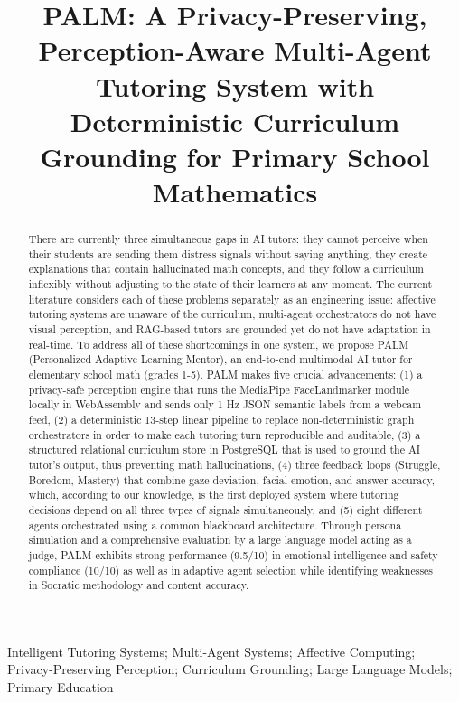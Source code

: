 \documentclass[conference, letterpaper]{IEEEtran}
\title{PALM: A Privacy-Preserving, Perception-Aware Multi-Agent Tutoring System with Deterministic Curriculum Grounding for Primary School Mathematics}
\author{\IEEEauthorblockN{Tanmay Mene, Atharva Humane, Mithilesh Singh, Vaibhav Walujkar}
\IEEEauthorblockA{Veermata Jijabai Technological Institute\\
Mumbai, India}
\and
\IEEEauthorblockN{Prof. Manasi Kulkarni}
\IEEEauthorblockA{Veermata Jijabai Technological Institute\\
Mumbai, India}}
\begin{document}
\maketitle

\begin{abstract}
There are currently three simultaneous gaps in AI tutors: they cannot perceive when their students are sending them distress signals without saying anything, they create explanations that contain hallucinated math concepts, and they follow a curriculum inflexibly without adjusting to the state of their learners at any moment. The current literature considers each of these problems separately as an engineering issue: affective tutoring systems are unaware of the curriculum, multi-agent orchestrators do not have visual perception, and RAG-based tutors are grounded yet do not have adaptation in real-time. To address all of these shortcomings in one system, we propose PALM (Personalized Adaptive Learning Mentor), an end-to-end multimodal AI tutor for elementary school math (grades 1-5). PALM makes five crucial advancements: (1) a privacy-safe perception engine that runs the MediaPipe FaceLandmarker module locally in WebAssembly and sends only 1 Hz JSON semantic labels from a webcam feed, (2) a deterministic 13-step linear pipeline to replace non-deterministic graph orchestrators in order to make each tutoring turn reproducible and auditable, (3) a structured relational curriculum store in PostgreSQL that is used to ground the AI tutor's output, thus preventing math hallucinations, (4) three feedback loops (Struggle, Boredom, Mastery) that combine gaze deviation, facial emotion, and answer accuracy, which, according to our knowledge, is the first deployed system where tutoring decisions depend on all three types of signals simultaneously, and (5) eight different agents orchestrated using a common blackboard architecture. Through persona simulation and a comprehensive evaluation by a large language model acting as a judge, PALM exhibits strong performance (9.5/10) in emotional intelligence and safety compliance (10/10) as well as in adaptive agent selection while identifying weaknesses in Socratic methodology and content accuracy.
\end{abstract}

\begin{IEEEkeywords}
Intelligent Tutoring Systems; Multi-Agent Systems; Affective Computing; Privacy-Preserving Perception; Curriculum Grounding; Large Language Models; Primary Education
\end{IEEEkeywords}
\end{document}
